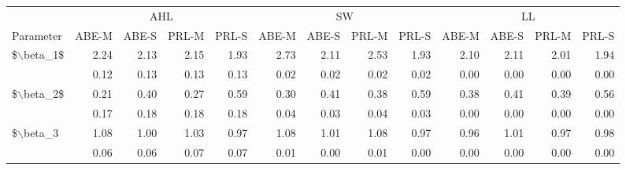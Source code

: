 \begin{tabular}{lrrrrrrrrrrrr}
  \hline
  & \multicolumn{4}{c}{AHL} & \multicolumn{4}{c}{SW} & \multicolumn{4}{c}{LL} \\

                             \cmidrule(lr){2-5}\cmidrule(lr){6-9}\cmidrule(lr){10-13} Parameter& ABE-M & ABE-S & PRL-M & PRL-S& ABE-M & ABE-S & PRL-M & PRL-S& ABE-M & ABE-S & PRL-M & PRL-S\\
 \hline
\$$\backslash$beta\_1\$ & 2.24 & 2.13 & 2.15 & 1.93 & 2.73 & 2.11 & 2.53 & 1.93 & 2.10 & 2.11 & 2.01 & 1.94 \\ 
   & 0.12 & 0.13 & 0.13 & 0.13 & 0.02 & 0.02 & 0.02 & 0.02 & 0.00 & 0.00 & 0.00 & 0.00 \\ 
  \$$\backslash$beta\_2\$ & 0.21 & 0.40 & 0.27 & 0.59 & 0.30 & 0.41 & 0.38 & 0.59 & 0.38 & 0.41 & 0.39 & 0.56 \\ 
   & 0.17 & 0.18 & 0.18 & 0.18 & 0.04 & 0.03 & 0.04 & 0.03 & 0.00 & 0.00 & 0.00 & 0.00 \\ 
  \$$\backslash$beta\_3 & 1.08 & 1.00 & 1.03 & 0.97 & 1.08 & 1.01 & 1.08 & 0.97 & 0.96 & 1.01 & 0.97 & 0.98 \\ 
   & 0.06 & 0.06 & 0.07 & 0.07 & 0.01 & 0.00 & 0.01 & 0.00 & 0.00 & 0.00 & 0.00 & 0.00 \\ 
   \hline
\end{tabular}
